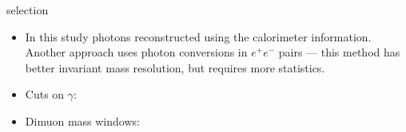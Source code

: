 \begin{frame}{\chib selection}
\setlength{\unitlength}{1mm}
\begin{itemize}
\item In this study photons reconstructed using the calorimeter information. 
Another approach uses photon conversions in $e^{+}e^{-}$ pairs  --- this method
has better invariant mass resolution, but requires more statistics.

\item Cuts on $\gamma$:
\begin{center}
\end{center}

\bigskip

\item Dimuon mass windows:
\begin{center}
\end{center}

\end{itemize}
\end{frame}
